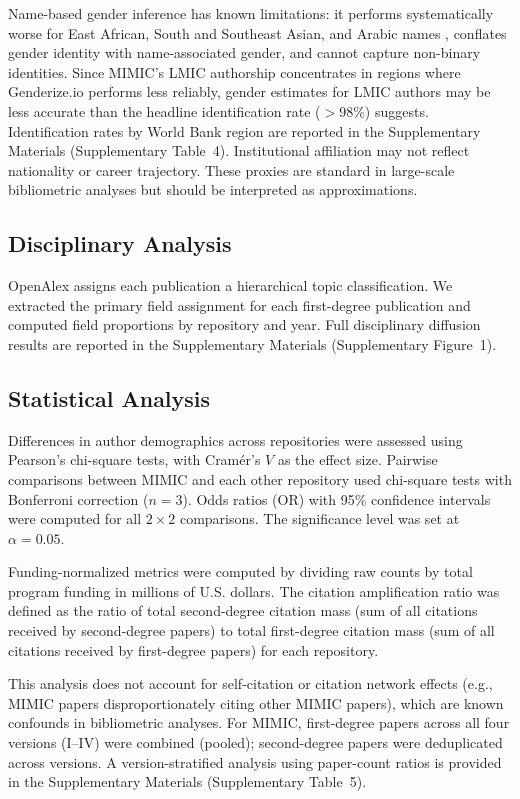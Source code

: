 \documentclass[11pt]{article}
\begin{document}
Name-based gender inference has known limitations: it performs systematically worse for East African, South and Southeast Asian, and Arabic names \cite{santamaria2018genderize}, conflates gender identity with name-associated gender, and cannot capture non-binary identities.
Since MIMIC's LMIC authorship concentrates in regions where Genderize.io performs less reliably, gender estimates for LMIC authors may be less accurate than the headline identification rate ($>$98\%) suggests.
Identification rates by World Bank region are reported in the Supplementary Materials (Supplementary Table~4).
Institutional affiliation may not reflect nationality or career trajectory.
These proxies are standard in large-scale bibliometric analyses but should be interpreted as approximations.

\subsection{Disciplinary Analysis}
\label{sec:disciplinary}

OpenAlex assigns each publication a hierarchical topic classification.
We extracted the primary field assignment for each first-degree publication and computed field proportions by repository and year.
Full disciplinary diffusion results are reported in the Supplementary Materials (Supplementary Figure~1).

\subsection{Statistical Analysis}
\label{sec:statistical}

Differences in author demographics across repositories were assessed using Pearson's chi-square tests, with Cram\'{e}r's $V$ as the effect size.
Pairwise comparisons between MIMIC and each other repository used chi-square tests with Bonferroni correction ($n = 3$).
Odds ratios (OR) with 95\% confidence intervals were computed for all $2 \times 2$ comparisons.
The significance level was set at $\alpha = 0.05$.

Funding-normalized metrics were computed by dividing raw counts by total program funding in millions of U.S. dollars.
The citation amplification ratio was defined as the ratio of total second-degree citation mass (sum of all citations received by second-degree papers) to total first-degree citation mass (sum of all citations received by first-degree papers) for each repository.

This analysis does not account for self-citation or citation network effects (e.g., MIMIC papers disproportionately citing other MIMIC papers), which are known confounds in bibliometric analyses. For MIMIC, first-degree papers across all four versions (I--IV) were combined (pooled); second-degree papers were deduplicated across versions. A version-stratified analysis using paper-count ratios is provided in the Supplementary Materials (Supplementary Table~5).
\end{document}
